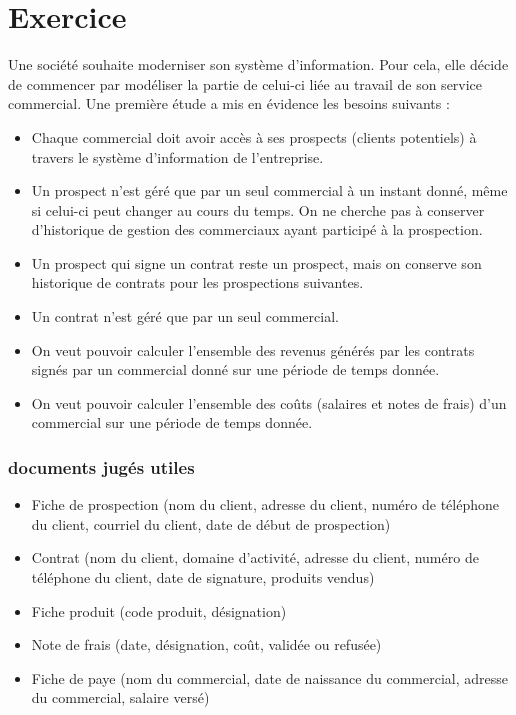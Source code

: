 \section*{Exercice}

Une société souhaite moderniser son système d'information. Pour cela, elle décide de commencer par modéliser la partie de celui-ci liée au travail de son service commercial. Une première étude a mis en évidence les besoins suivants : \\
\begin{itemize}
    \item Chaque commercial doit avoir accès à ses prospects (clients potentiels) à travers le système d'information de l'entreprise.
    \item Un prospect n'est géré que par un seul commercial à un instant donné, même si celui-ci peut changer au cours du temps. On ne cherche pas à conserver d'historique de gestion des commerciaux ayant participé à la prospection.
    \item Un prospect qui signe un contrat reste un prospect, mais on conserve son historique de contrats pour les prospections suivantes.
    \item Un contrat n'est géré que par un seul commercial.
    \item On veut pouvoir calculer l'ensemble des revenus générés par les contrats signés par un commercial donné sur une période de temps donnée.
    \item On veut pouvoir calculer l'ensemble des coûts (salaires et notes de frais) d'un commercial sur une période de temps donnée.
\end{itemize}

\subsubsection*{documents jugés utiles}
\begin{itemize}
    \item Fiche de prospection (nom du client, adresse du client, numéro de téléphone du client, courriel du client, date de début de prospection)
    \item Contrat (nom du client, domaine d'activité, adresse du client, numéro de téléphone du client, date de signature, produits vendus)
    \item Fiche produit (code produit, désignation)
    \item Note de frais (date, désignation, coût, validée ou refusée)
    \item Fiche de paye (nom du commercial, date de naissance du commercial, adresse du commercial, salaire versé)
\end{itemize}
